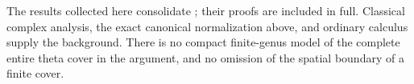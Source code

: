The results collected here consolidate \cite{Notes}; their proofs are
included in full. Classical complex analysis, the exact canonical
normalization above, and ordinary calculus supply the background. There
is no compact finite-genus model of the complete entire theta cover in
the argument, and no omission of the spatial boundary of a finite cover.
